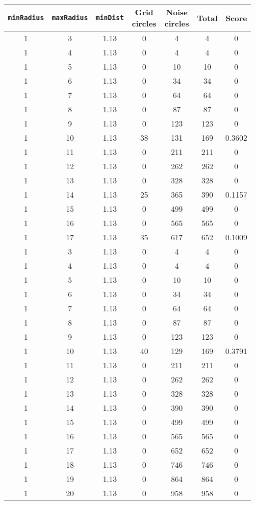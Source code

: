 \documentclass[letterpaper, 12pt]{article}
\begin{document}
\begin{longtable}{|c|c|c|c|c|c|c|}
\hline
\textbf{\texttt{minRadius}} & \textbf{\texttt{maxRadius}} & \textbf{\texttt{minDist}} & \textbf{Grid circles} & \textbf{Noise circles} & \textbf{Total} & \textbf{Score} \\
\hline
1 & 3 & 1.13 & 0 & 4 & 4 & 0 \\
\hline
1 & 4 & 1.13 & 0 & 4 & 4 & 0 \\
\hline
1 & 5 & 1.13 & 0 & 10 & 10 & 0 \\
\hline
1 & 6 & 1.13 & 0 & 34 & 34 & 0 \\
\hline
1 & 7 & 1.13 & 0 & 64 & 64 & 0 \\
\hline
1 & 8 & 1.13 & 0 & 87 & 87 & 0 \\
\hline
1 & 9 & 1.13 & 0 & 123 & 123 & 0 \\
\hline
1 & 10 & 1.13 & 38 & 131 & 169 & 0.3602 \\
\hline
1 & 11 & 1.13 & 0 & 211 & 211 & 0 \\
\hline
1 & 12 & 1.13 & 0 & 262 & 262 & 0 \\
\hline
1 & 13 & 1.13 & 0 & 328 & 328 & 0 \\
\hline
1 & 14 & 1.13 & 25 & 365 & 390 & 0.1157 \\
\hline
1 & 15 & 1.13 & 0 & 499 & 499 & 0 \\
\hline
1 & 16 & 1.13 & 0 & 565 & 565 & 0 \\
\hline
1 & 17 & 1.13 & 35 & 617 & 652 & 0.1009 \\
\hline
1 & 3 & 1.13 & 0 & 4 & 4 & 0 \\
\hline
1 & 4 & 1.13 & 0 & 4 & 4 & 0 \\
\hline
1 & 5 & 1.13 & 0 & 10 & 10 & 0 \\
\hline
1 & 6 & 1.13 & 0 & 34 & 34 & 0 \\
\hline
1 & 7 & 1.13 & 0 & 64 & 64 & 0 \\
\hline
1 & 8 & 1.13 & 0 & 87 & 87 & 0 \\
\hline
1 & 9 & 1.13 & 0 & 123 & 123 & 0 \\
\hline
1 & 10 & 1.13 & 40 & 129 & 169 & 0.3791 \\
\hline
1 & 11 & 1.13 & 0 & 211 & 211 & 0 \\
\hline
1 & 12 & 1.13 & 0 & 262 & 262 & 0 \\
\hline
1 & 13 & 1.13 & 0 & 328 & 328 & 0 \\
\hline
1 & 14 & 1.13 & 0 & 390 & 390 & 0 \\
\hline
1 & 15 & 1.13 & 0 & 499 & 499 & 0 \\
\hline
1 & 16 & 1.13 & 0 & 565 & 565 & 0 \\
\hline
1 & 17 & 1.13 & 0 & 652 & 652 & 0 \\
\hline
1 & 18 & 1.13 & 0 & 746 & 746 & 0 \\
\hline
1 & 19 & 1.13 & 0 & 864 & 864 & 0 \\
\hline
1 & 20 & 1.13 & 0 & 958 & 958 & 0 \\
\hline
\end{longtable}
\end{document}
